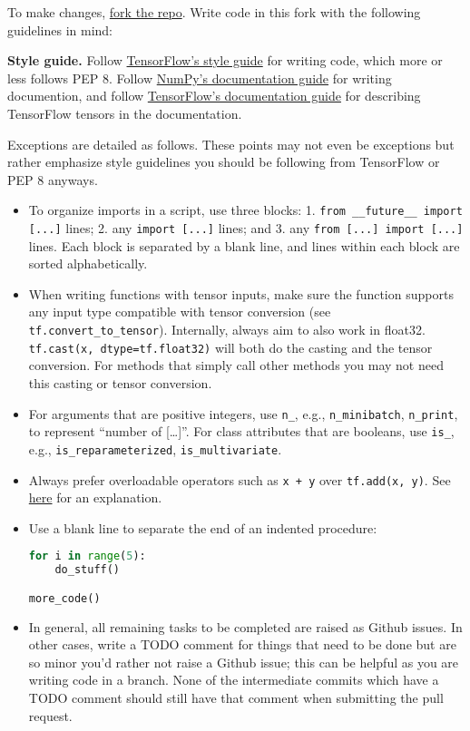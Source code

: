 To make changes,
\href{https://help.github.com/articles/working-with-forks/}{fork the repo}.
Write code in this fork with the following guidelines in mind:

\textbf{Style guide.}
Follow
\href{https://www.tensorflow.org/versions/master/how_tos/style_guide.html}{TensorFlow's
style guide}
for writing code, which more or less follows PEP 8.
Follow
\href{https://github.com/numpy/numpy/blob/master/doc/HOWTO_DOCUMENT.rst.txt}
{NumPy's documentation guide}
for writing documention,
and follow
\href{https://www.tensorflow.org/versions/master/how_tos/documentation/index.html}{TensorFlow's documentation guide}
for describing TensorFlow tensors in the documentation.

Exceptions are detailed as follows. These points may not
even be exceptions but rather emphasize style guidelines you
should be following from TensorFlow or PEP 8 anyways.

\begin{itemize}
\item
  To organize imports in a script, use three blocks: 1. \texttt{from __future__
  import [...]} lines; 2. any \texttt{import [...]} lines; and 3. any
  \texttt{from [...] import [...]} lines. Each block is separated by a blank line,
  and lines within each block are sorted alphabetically.
\item
  When writing functions with tensor inputs, make sure the function
  supports any input type compatible with tensor
  conversion (see \texttt{tf.convert_to_tensor}).
  Internally, always aim to also work in float32.
  \texttt{tf.cast(x, dtype=tf.float32)} will both do the casting and the
  tensor conversion. For methods that simply call other methods you
  may not need this casting or tensor conversion.
\item
  For arguments that are positive integers, use \texttt{n\_}, e.g.,
  \texttt{n\_minibatch}, \texttt{n\_print}, to represent ``number of
  {[}\ldots{}{]}''.  For class attributes that are booleans, use
  \texttt{is_}, e.g., \texttt{is_reparameterized},
  \texttt{is_multivariate}.
\item
  Always prefer overloadable operators such as \texttt{x + y} over
  \texttt{tf.add(x, y)}. See
  \href{http://stackoverflow.com/questions/37900780/in-tensorflow-what-is-the-difference-between-tf-add-and-operator}{here}
  for an explanation.
\item
  Use a blank line to separate the end of an indented procedure:
\begin{lstlisting}[language=Python]
for i in range(5):
    do_stuff()

more_code()
\end{lstlisting}
\item
  In general, all remaining tasks to be completed are raised as Github
  issues. In other cases, write a TODO comment for things that need to
  be done but are so minor you'd rather not raise a Github issue; this
  can be helpful as you are writing code in a branch. None of the
  intermediate commits which have a TODO comment should still have
  that comment when submitting the pull request.
\end{itemize}

